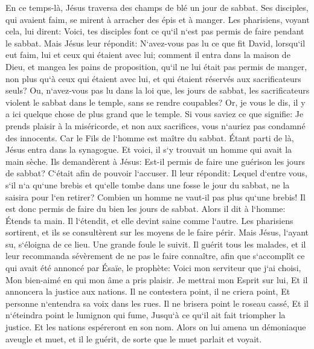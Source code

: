 \verse En ce temps-là, Jésus traversa des champs de blé un jour de sabbat. Ses disciples, qui avaient faim, se mirent à arracher des épis et à manger. 
\verse Les pharisiens, voyant cela, lui dirent: Voici, tes disciples font ce qu`il n`est pas permis de faire pendant le sabbat. 
\verse Mais Jésus leur répondit: N`avez-vous pas lu ce que fit David, lorsqu`il eut faim, lui et ceux qui étaient avec lui; 
\verse comment il entra dans la maison de Dieu, et mangea les pains de proposition, qu`il ne lui était pas permis de manger, non plus qu`à ceux qui étaient avec lui, et qui étaient réservés aux sacrificateurs seuls? 
\verse Ou, n`avez-vous pas lu dans la loi que, les jours de sabbat, les sacrificateurs violent le sabbat dans le temple, sans se rendre coupables? 
\verse Or, je vous le dis, il y a ici quelque chose de plus grand que le temple. 
\verse Si vous saviez ce que signifie: Je prends plaisir à la miséricorde, et non aux sacrifices, vous n`auriez pas condamné des innocents. 
\verse Car le Fils de l`homme est maître du sabbat. 
\verse Étant parti de là, Jésus entra dans la synagogue. 
\verse Et voici, il s`y trouvait un homme qui avait la main sèche. Ils demandèrent à Jésus: Est-il permis de faire une guérison les jours de sabbat? C`était afin de pouvoir l`accuser. 
\verse Il leur répondit: Lequel d`entre vous, s`il n`a qu`une brebis et qu`elle tombe dans une fosse le jour du sabbat, ne la saisira pour l`en retirer? 
\verse Combien un homme ne vaut-il pas plus qu`une brebis! Il est donc permis de faire du bien les jours de sabbat. 
\verse Alors il dit à l`homme: Étends ta main. Il l`étendit, et elle devint saine comme l`autre. 
\verse Les pharisiens sortirent, et ils se consultèrent sur les moyens de le faire périr. 
\verse Mais Jésus, l`ayant su, s`éloigna de ce lieu. Une grande foule le suivit. Il guérit tous les malades, 
\verse et il leur recommanda sévèrement de ne pas le faire connaître, 
\verse afin que s`accomplît ce qui avait été annoncé par Ésaïe, le prophète: 
\verse Voici mon serviteur que j`ai choisi, Mon bien-aimé en qui mon âme a pris plaisir. Je mettrai mon Esprit sur lui, Et il annoncera la justice aux nations. 
\verse Il ne contestera point, il ne criera point, Et personne n`entendra sa voix dans les rues. 
\verse Il ne brisera point le roseau cassé, Et il n`éteindra point le lumignon qui fume, Jusqu`à ce qu`il ait fait triompher la justice. 
\verse Et les nations espéreront en son nom. 
\verse Alors on lui amena un démoniaque aveugle et muet, et il le guérit, de sorte que le muet parlait et voyait. 

